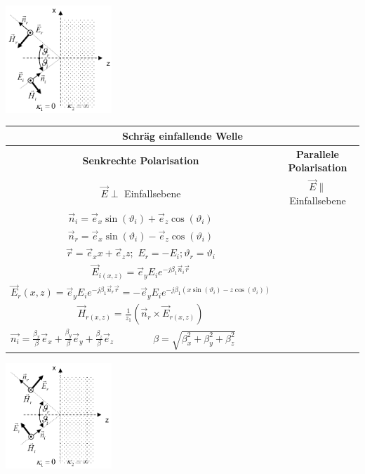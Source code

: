 		\begin{minipage}{4.3cm}
			\includegraphics[width=4cm]{./images/EMW_LHR_SchraegSenkrechtPolarisiert.png} 
        \end{minipage}
		\renewcommand{\arraystretch}{1.6}
		\begin{tabular}{| c || c | }
			\hline
				\multicolumn{2}{|c|}{\textbf{Schräg einfallende Welle}} \\
			\hline
				\textbf{Senkrechte Polarisation}
				& 
				\textbf{Parallele Polarisation} \\	
			\hline		
				$\vec{E} \perp $ Einfallsebene
				& 
				$\vec{E} \parallel $ Einfallsebene \\
			\hline	
 				$\vec{n}_i = \vec{e}_x \sin(\vartheta_i)+\vec{e}_z \cos(\vartheta_i)$&\\
 				$\vec{n}_r=\vec{e}_x \sin(\vartheta_i)- \vec{e}_z \cos(\vartheta_i)$ &\\
  				$\vec{r}=\vec{e}_x x+\vec{e}_z z;$ 
 				$E_r=-E_i; \vartheta_r =\vartheta_i$&\\
 				$\vec{E}_{i(x,z)} =\vec{e}_y E_i e^{-j \beta_1 \vec{n}_i \vec{r}}$&\\ 
 				$\vec{E}_r(x,z) =\vec{e}_y E_i e^{-j \beta_1 \vec{n}_r
 				\vec{r}}=- \vec{e}_y E_i e^{-j \beta_1
 				(x\sin(\vartheta_i)-z\cos(\vartheta_i))}$&\\
 				$\vec{H}_{r(x,z)}=\frac{1}{z_1}(\vec{n}_r\times \vec{E}_{r(x,z)})$&\\
 				\hline
 				\multicolumn{2}{|l|}{
				$\vec{n_i}=
				\frac{\beta_x}{\beta}\vec{e}_x + \frac{\beta_y}{\beta} \vec{e}_y + 
				\frac{\beta_z}{\beta} \vec{e}_z
				\qquad \qquad \beta=\sqrt{\beta_x^2+\beta_y^2+\beta_z^2}$}\\
			\hline
   		\end{tabular}
		\renewcommand{\arraystretch}{1}	
		\begin{minipage}{4.3cm}
			\includegraphics[width=4cm]{./images/EMW_LHR_SchraegParallelPolarisiert.png} 
        \end{minipage}	

